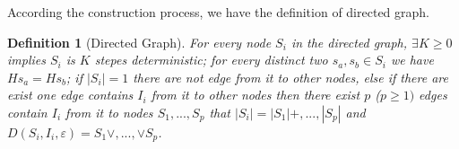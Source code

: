 \documentclass[conference]{IEEEtran} %
\newtheorem{definition}{Definition}
\begin{document}

According the construction process, we have the definition of directed graph.
\begin{definition}[Directed Graph]
For every node $S_i$ in the directed graph, $\exists K \ge 0$ implies $S_i$ is $K$ stepes deterministic; for every distinct two $s_a, s_b \in S_i$ we have $Hs_a=Hs_b$; if $|S_i|=1$ there are not edge from it to other nodes, else if there are exist one edge contains $I_i$ from it to other nodes then there exist $p$ ($p\ge 1)$ edges contain $I_i$ from it to nodes $S_1,...,S_p$ that $|S_i|= |S_1|+,...,|S_p|$ and $D\left(S_i,I_i,\varepsilon\right)=S_1\vee,...,\vee S_p$.
\end{definition}
\end{document}
